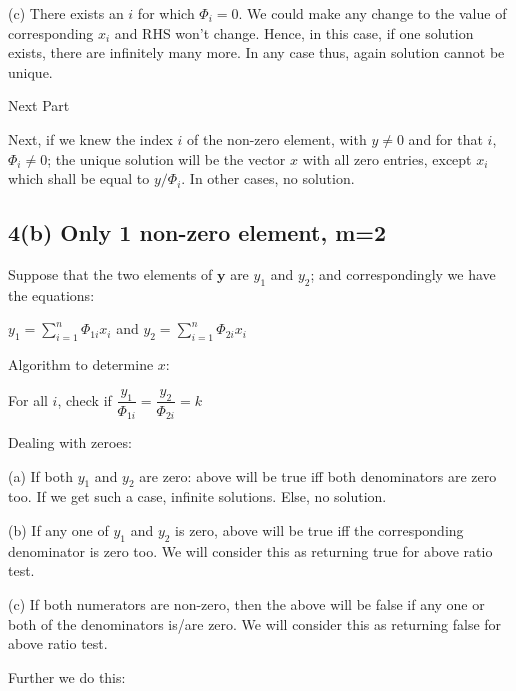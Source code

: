 \documentclass[fleqn, 11pt]{article}
\begin{document}
(c) There exists an $i$ for which $\Phi_i = 0$. We could make any change to 
the value of corresponding $x_i$ and RHS won't change. Hence, in this case, 
if one solution exists, there are infinitely many more. In any case thus, again 
solution cannot be unique. 

\bigskip 

{\textsf{Next Part}}

\medskip

Next, if we knew the index $i$ of the non-zero element, with $y \neq 0$
and for that $i$, $\Phi_i \neq 0$; the unique solution will be
the vector $x$ with all zero entries, except $x_i$ which shall be equal
to $y/ \Phi_i$. In other cases, no solution. 



\subsection*{4(b) Only 1 non-zero element, m=2}

Suppose that the two elements of $\mathbf{y}$ are $y_1$ and $y_2$; 
and correspondingly we 
have the equations:

$y_1=\displaystyle \sum_{i=1}^{n} \Phi_{1i} x_i$ \hspace{10pt} and 
 \hspace{10pt} $y_2=\displaystyle \sum_{i=1}^{n} \Phi_{2i} x_i$ 
 
\smallskip

Algorithm to determine $x$: 

\smallskip

For all $i$, check if 
$\dfrac{y_1}{\Phi_{1i}}=\dfrac{y_2}{\Phi_{2i}}=k$

\medskip

Dealing with zeroes: 

\smallskip

(a) If both $y_1$ and $y_2$ are zero: above will be true iff both 
denominators are zero too. If we get such a case, infinite solutions. 
Else, no solution. 

(b) If any one of $y_1$ and $y_2$ is zero, above will be true iff the 
corresponding denominator is zero too. We will consider this as returning true for above ratio test.

(c) If both numerators are non-zero, then the above will be false if 
any one or both of the denominators is/are zero.
We will consider this as returning false for above ratio test.


\medskip

Further we do this:
\end{document}
